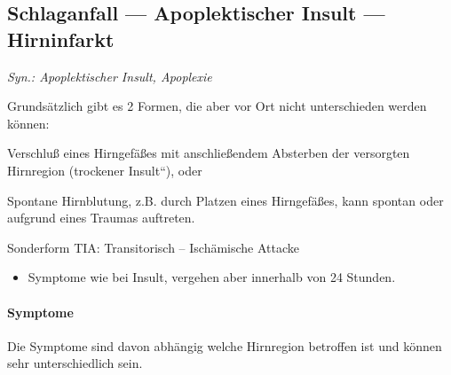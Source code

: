 \subsection{Schlaganfall --- Apoplektischer Insult --- Hirninfarkt}
\label{topic:tia}

\emph{Syn.: Apoplektischer Insult, Apoplexie}

Grundsätzlich gibt es 2 Formen, die aber vor Ort nicht
unterschieden werden können:
\begin{description}

    \item[>>Trockener<< Insult] Verschluß eines Hirngefäßes mit anschließendem
    Absterben der versorgten Hirnregion ({\quotedblbase}trockener
    Insult{\textquotedblleft}), oder
    \item[>>Blutiger<< Insult] Spontane Hirnblutung, z.B. durch Platzen eines Hirngefäßes, kann spontan oder aufgrund eines Traumas auftreten.
    \item 
    Sonderform TIA: Transitorisch -- Ischämische Attacke
    \begin{itemize}
        \item Symptome wie bei Insult, vergehen aber innerhalb von 24 Stunden.
    \end{itemize}
\end{description}




\paragraph{Symptome}

Die Symptome sind davon abhängig welche Hirnregion betroffen ist und 
können sehr unterschiedlich sein.

